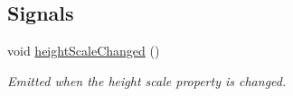 \subsection*{Signals}
\begin{DoxyCompactItemize}
\item 
\hypertarget{class_command_suggestion_list_a9efae0883b3853d30dd5b94412c040de}{void \hyperlink{class_command_suggestion_list_a9efae0883b3853d30dd5b94412c040de}{height\-Scale\-Changed} ()}\label{class_command_suggestion_list_a9efae0883b3853d30dd5b94412c040de}

\begin{DoxyCompactList}\small\item\em Emitted when the height scale property is changed. \end{DoxyCompactList}\end{DoxyCompactItemize}
